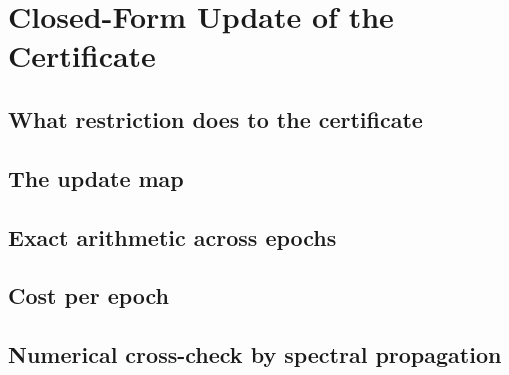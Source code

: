 
\section{Closed-Form Update of the Certificate}
\label{p2:sec:update}

\subsection{What restriction does to the certificate}
\label{p2:sub:what_restriction_does}

\subsection{The update map}
\label{p2:sub:the_update_map}

\subsection{Exact arithmetic across epochs}
\label{p2:sub:exact_arithmetic_across_epochs}

\subsection{Cost per epoch}
\label{p2:sub:cost_per_epoch}

\subsection{Numerical cross-check by spectral propagation}
\label{p2:sub:spectral_cross_check}

